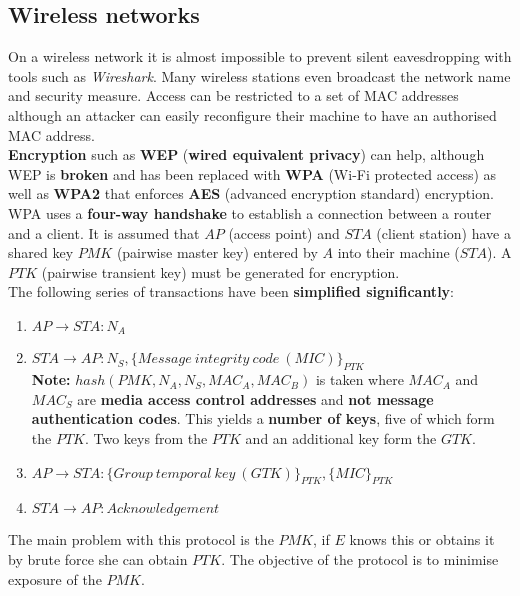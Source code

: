 \documentclass[final]{article}
\newcommand{\np}{\vspace{8pt} \\}
\begin{document}
\subsection{Wireless networks}
On a wireless network it is almost impossible to prevent silent eavesdropping with tools such as \textit{Wireshark}. Many wireless stations even broadcast the network name and security measure. Access can be restricted to a set of MAC addresses although an attacker can easily reconfigure their machine to have an authorised MAC address. \np
\textbf{Encryption} such as \textbf{WEP} (\textbf{wired equivalent privacy}) can help, although WEP is \textbf{broken} and has been replaced with \textbf{WPA} (Wi-Fi protected access) as well as \textbf{WPA2} that enforces \textbf{AES} (advanced encryption standard) encryption. WPA uses a \textbf{four-way handshake} to establish a connection between a router and a client. It is assumed that $ AP $ (access point) and $ STA $ (client station) have a shared key $ PMK $ (pairwise master key) entered by $ A $ into their machine ($ STA $). A $ PTK $ (pairwise transient key) must be generated for encryption.
\pagebreak
\\
The following series of transactions have been \textbf{simplified significantly}:
\begin{enumerate}
	\item $ AP \rightarrow STA : N_{A} $
	\item $ STA \rightarrow AP : N_{S}, \{ Message\ integrity\ code\ (MIC) \}_{PTK} $ \\
	\textbf{Note:} $ hash(PMK, N_{A}, N_{S}, MAC_{A}, MAC_{B}) $ is taken where $ MAC_{A} $ and $ MAC_{S} $ are \textbf{media access control addresses} and \textbf{not message authentication codes}. This yields a \textbf{number of keys}, five of which form the $ PTK $. Two keys from the $ PTK $ and an additional key form the $ GTK $.
	\item $ AP \rightarrow STA : \{ Group\ temporal\ key\ (GTK) \}_{PTK}, \{ MIC \}_{PTK} $
	\item $ STA \rightarrow AP : Acknowledgement $
\end{enumerate}
The main problem with this protocol is the $ PMK $, if $ E $ knows this or obtains it by brute force she can obtain $ PTK $. The objective of the protocol  is to minimise exposure of the $ PMK $.
\end{document}
